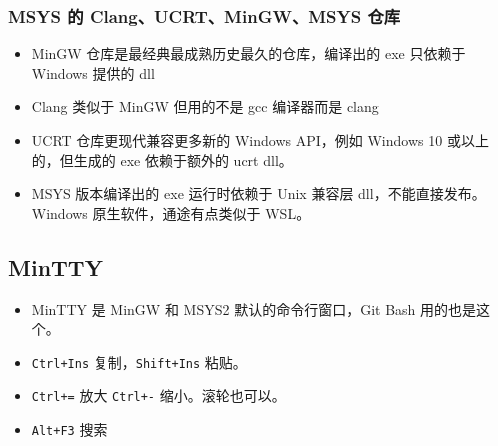 \subsubsection{MSYS 的 Clang、UCRT、MinGW、MSYS 仓库}
\begin{itemize}
\item MinGW 仓库是最经典最成熟历史最久的仓库，编译出的 exe 只依赖于 Windows 提供的 dll
\item Clang 类似于 MinGW 但用的不是 gcc 编译器而是 clang
\item UCRT 仓库更现代兼容更多新的 Windows API，例如 Windows 10 或以上的，但生成的 exe 依赖于额外的 ucrt dll。
\item MSYS 版本编译出的 exe 运行时依赖于 Unix 兼容层 dll，不能直接发布。 Windows 原生软件，通途有点类似于 WSL。
\end{itemize}

\subsection{MinTTY}
\begin{itemize}
\item MinTTY 是 MinGW 和 MSYS2 默认的命令行窗口，Git Bash 用的也是这个。
\item \verb`Ctrl+Ins` 复制，\verb`Shift+Ins` 粘贴。
\item \verb`Ctrl+=` 放大 \verb`Ctrl+-` 缩小。滚轮也可以。
\item \verb`Alt+F3` 搜索
\end{itemize}
